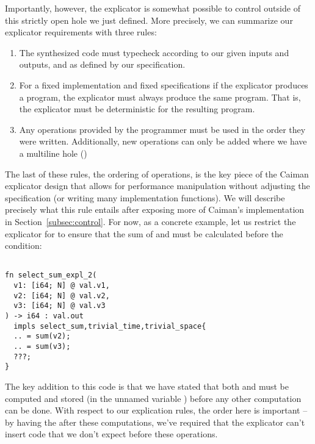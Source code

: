 Importantly, however, the explicator is somewhat possible to control outside of this strictly open  hole we just defined.  More precisely, we can summarize our explicator requirements with three rules:
%
\begin{enumerate}
\item The synthesized code must typecheck according to our given inputs and outputs, and as defined by our specification.
\item For a fixed implementation and fixed specifications if the explicator produces a program, the explicator must always produce the same program.  That is, the explicator must be deterministic for the resulting program.
\item Any operations provided by the programmer must be used in the order they were written.  Additionally, new operations can only be added where we have a multiline hole ()
\end{enumerate}
%
The last of these rules, the ordering of operations, is the key piece of the Caiman explicator design that allows for performance manipulation without adjusting the specification (or writing many implementation functions).  We will describe precisely what this rule entails after exposing more of Caiman's implementation in Section~\ref{subsec:control}.  For now, as a concrete example, let us restrict the explicator for  to ensure that the sum of  and  must be calculated before the condition:
%
\begin{lstlisting}

fn select_sum_expl_2(
  v1: [i64; N] @ val.v1,
  v2: [i64; N] @ val.v2,
  v3: [i64; N] @ val.v3
) -> i64 : val.out 
  impls select_sum,trivial_time,trivial_space{
  .. = sum(v2);
  .. = sum(v3);
  ???;
}
\end{lstlisting}
%
The key addition to this code is that we have stated that both  and  must be computed and stored (in the unnamed variable ) before any other computation can be done.  With respect to our explication rules, the order here is important -- by having the  after these computations, we've required that the explicator can't insert code that we don't expect before these operations.

